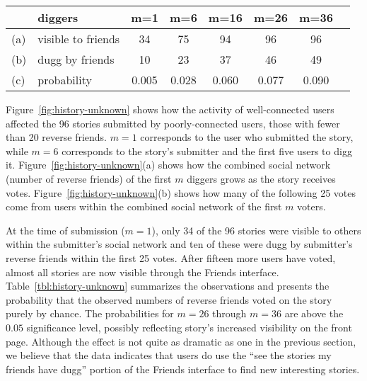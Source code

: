 \documentclass[]{article}
\newcommand{\figref}[1]{Figure~\ref{#1}}
\newcommand{\tabref}[1]{Table~\ref{#1}}
\begin{document}
\begin{table*}
  \centering
\begin{tabular}{|ll|c|c|c|c|c|c|}
  \hline
& \textbf{diggers} & \textbf{m=1} & \textbf{m=6} & \textbf{m=16} & \textbf{m=26} & \textbf{m=36} \\ \hline
(a) & visible to friends & 34 & 75  & 94 & 96  & 96  \\(b) & dugg by friends & 10 & 23 & 37 & 46 & 49 \\(c) & probability & 0.005 & 0.028 & 0.060 & 0.077 & 0.090 \\ \hline
\end{tabular}

  \caption{Number of stories posted by poorly-connected users that were (a) made visible to others by
  digging activities of well-connected users, (b) dugg by friends of the first $m$ diggers within the next 25 diggs,
  and for the stories that were dugg by friends, (c) the average probability that the observed numbers of friends
  dugg the story by chance }\label{tbl:history-unknown}
\end{table*}



\figref{fig:history-unknown} shows how the activity of
well-connected users affected the 96 stories submitted by poorly-connected users, those with fewer than 20 reverse friends.
$m=1$ corresponds to the user who submitted the story, while $m=6$
corresponds to the story's submitter and the first five users to
digg it. \figref{fig:history-unknown}(a) shows how the combined
social network (number of reverse friends) of the first $m$ diggers grows as the story
receives votes. \figref{fig:history-unknown}(b) shows how many of
the following 25 votes come from users within the combined social
network of the first $m$ voters.


 At the time of submission ($m=1$), only 34 of the 96
stories were visible to others within the submitter's social
network and ten of these were dugg by submitter's reverse friends within the first 25 votes.
After fifteen more users have voted, almost all stories are now visible through
the Friends interface.
\tabref{tbl:history-unknown} summarizes the observations
and presents the probability that the observed numbers of reverse friends
voted on the story purely by chance. The probabilities for $m=26$ through $m=36$ are
above the $0.05$ significance level, possibly reflecting story's
increased visibility on the
front page. Although the effect is not quite as dramatic as one in
the previous section, we believe that the data indicates that users do
use the ``see the stories my friends have dugg'' portion of the Friends
interface to find new interesting stories.
\end{document}
